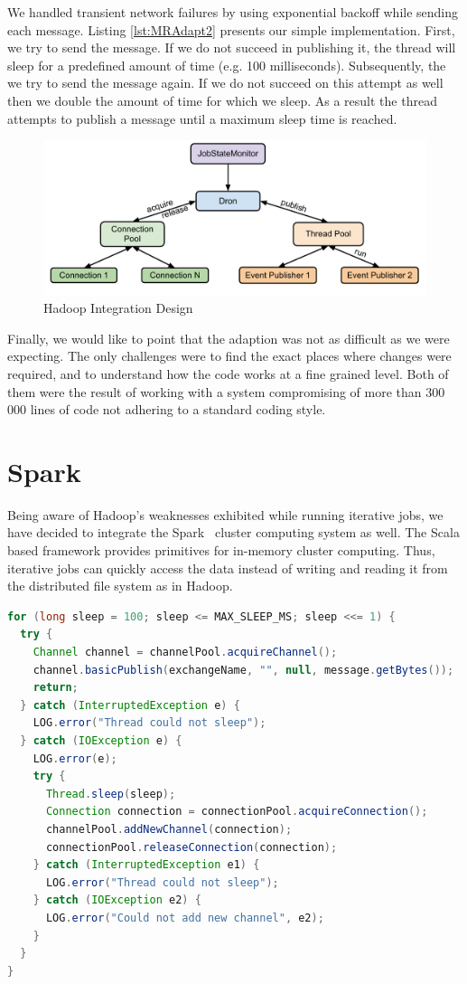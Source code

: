 \documentclass[11pt,a4paper,twoside]{report}
\begin{document}
We handled transient network failures by using exponential backoff while sending each message. Listing \ref{lst:MRAdapt2} presents our simple implementation. First, we try to send the message. If we do not succeed in publishing it, the thread will sleep for a predefined amount of time (e.g. 100 milliseconds). Subsequently, the we try to send the message again. If we do not succeed on this attempt as well then we double the amount of time for which we sleep. As a result the thread attempts to publish a message until a maximum sleep time is reached.

\begin{figure}[h]
\centering
\includegraphics[scale=0.7]{HadoopAdapt}
\caption{Hadoop Integration Design}
\label{fig:HadoopAdapt}
\end{figure}

Finally, we would like to point that the adaption was not as difficult as we were expecting. The only challenges were to find the exact places where changes were required, and to understand how the code works at a fine grained level. Both of them were the result of working with a system compromising of more than 300 000 lines of code not adhering to a standard coding style.


\section{Spark}
Being aware of Hadoop's weaknesses exhibited while running iterative jobs, we have decided to integrate the Spark~\cite{Spark} cluster computing system as well. The Scala based framework provides primitives for in-memory cluster computing. Thus, iterative jobs can quickly access the data instead of writing and reading it from the distributed file system as in Hadoop.


\newpage
\begin{lstlisting}[language=Java,caption={Event Publisher}, label={lst:MRAdapt2}]
for (long sleep = 100; sleep <= MAX_SLEEP_MS; sleep <<= 1) {
  try {
    Channel channel = channelPool.acquireChannel();
    channel.basicPublish(exchangeName, "", null, message.getBytes());
    return;
  } catch (InterruptedException e) {
    LOG.error("Thread could not sleep");
  } catch (IOException e) {
    LOG.error(e);
    try {
      Thread.sleep(sleep);
      Connection connection = connectionPool.acquireConnection();
      channelPool.addNewChannel(connection);
      connectionPool.releaseConnection(connection);
    } catch (InterruptedException e1) {
      LOG.error("Thread could not sleep");
    } catch (IOException e2) {
      LOG.error("Could not add new channel", e2);
    }
  }
}
\end{lstlisting}
\end{document}
